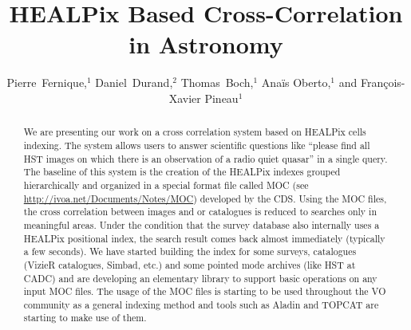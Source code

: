 
\resetcounters




\title{HEALPix Based Cross-Correlation in Astronomy}
\author{Pierre~Fernique,$^1$ Daniel~Durand,$^2$ Thomas~Boch,$^1$ Ana\"is Oberto,$^1$ and Fran\c{c}ois-Xavier Pineau$^1$
}


\begin{abstract}
We are presenting our work on a cross correlation system based on HEALPix cells indexing. The system allows users to answer scientific questions like ``please find all HST images on which there is an observation of a radio quiet quasar'' in a single query. The baseline of this system is the creation of the HEALPix indexes grouped hierarchically and organized in a special format file called MOC (see \url{http://ivoa.net/Documents/Notes/MOC}) developed by the CDS. Using the MOC files, the cross correlation between images and or catalogues is reduced to searches only in meaningful areas. Under the condition that the survey database also internally uses a HEALPix positional index, the search result comes back almost immediately (typically a few seconds). We have started building the index for some surveys, catalogues (VizieR catalogues, Simbad, etc.) and some pointed mode archives (like HST at CADC) and are developing an elementary library to support basic operations on any input MOC files. The usage of the MOC files is starting to be used throughout the VO community as a general indexing method and tools such as Aladin and TOPCAT are starting to make use of them.
\end{abstract}

